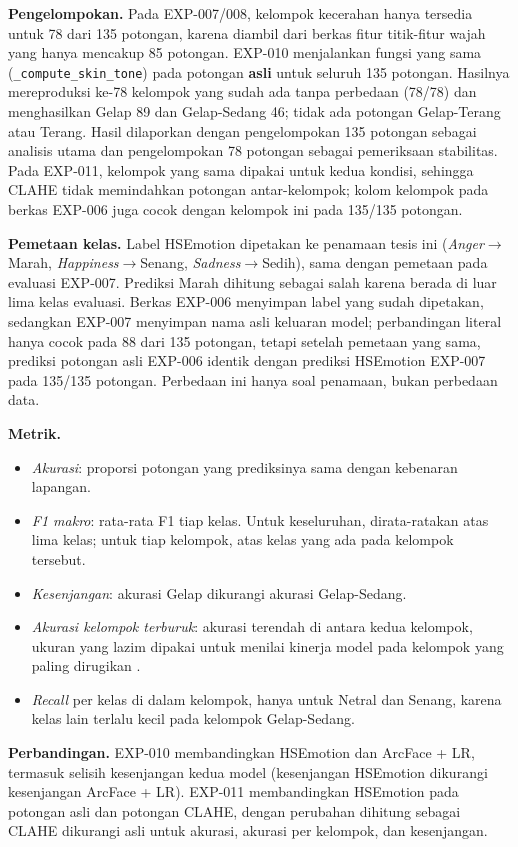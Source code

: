 \textbf{Pengelompokan.} Pada EXP-007/008, kelompok kecerahan hanya tersedia untuk 78 dari 135 potongan, karena diambil dari berkas fitur titik-fitur wajah yang hanya mencakup 85 potongan. EXP-010 menjalankan fungsi yang sama (\texttt{\_compute\_skin\_tone}) pada potongan \textbf{asli} untuk seluruh 135 potongan. Hasilnya mereproduksi ke-78 kelompok yang sudah ada tanpa perbedaan (78/78) dan menghasilkan Gelap 89 dan Gelap-Sedang 46; tidak ada potongan Gelap-Terang atau Terang. Hasil dilaporkan dengan pengelompokan 135 potongan sebagai analisis utama dan pengelompokan 78 potongan sebagai pemeriksaan stabilitas. Pada EXP-011, kelompok yang sama dipakai untuk kedua kondisi, sehingga CLAHE tidak memindahkan potongan antar-kelompok; kolom kelompok pada berkas EXP-006 juga cocok dengan kelompok ini pada 135/135 potongan.

\textbf{Pemetaan kelas.} Label HSEmotion dipetakan ke penamaan tesis ini (\textit{Anger}$\to$Marah, \textit{Happiness}$\to$Senang, \textit{Sadness}$\to$Sedih), sama dengan pemetaan pada evaluasi EXP-007. Prediksi Marah dihitung sebagai salah karena berada di luar lima kelas evaluasi. Berkas EXP-006 menyimpan label yang sudah dipetakan, sedangkan EXP-007 menyimpan nama asli keluaran model; perbandingan literal hanya cocok pada 88 dari 135 potongan, tetapi setelah pemetaan yang sama, prediksi potongan asli EXP-006 identik dengan prediksi HSEmotion EXP-007 pada 135/135 potongan. Perbedaan ini hanya soal penamaan, bukan perbedaan data.

\textbf{Metrik.}
\begin{itemize}
  \item \textit{Akurasi}: proporsi potongan yang prediksinya sama dengan kebenaran lapangan.
  \item \textit{F1 makro}: rata-rata F1 tiap kelas. Untuk keseluruhan, dirata-ratakan atas lima kelas; untuk tiap kelompok, atas kelas yang ada pada kelompok tersebut.
  \item \textit{Kesenjangan}: akurasi Gelap dikurangi akurasi Gelap-Sedang.
  \item \textit{Akurasi kelompok terburuk}: akurasi terendah di antara kedua kelompok, ukuran yang lazim dipakai untuk menilai kinerja model pada kelompok yang paling dirugikan \citep{sagawa2020dro}.
  \item \textit{Recall} per kelas di dalam kelompok, hanya untuk Netral dan Senang, karena kelas lain terlalu kecil pada kelompok Gelap-Sedang.
\end{itemize}

\textbf{Perbandingan.} EXP-010 membandingkan HSEmotion dan ArcFace + LR, termasuk selisih kesenjangan kedua model (kesenjangan HSEmotion dikurangi kesenjangan ArcFace + LR). EXP-011 membandingkan HSEmotion pada potongan asli dan potongan CLAHE, dengan perubahan dihitung sebagai CLAHE dikurangi asli untuk akurasi, akurasi per kelompok, dan kesenjangan.

